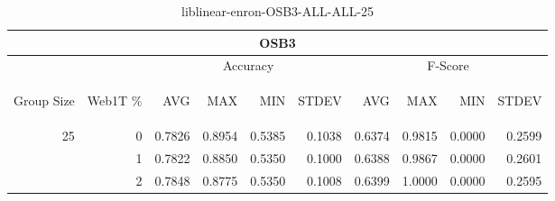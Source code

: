 \begin{center}
\begin{table}[htbp]
\begin{tabular}{ | r | r | r | r | r | r | r | r | r | r |}
\hline
\multicolumn{10}{|c|}{OSB3}\\
\hline
 & & \multicolumn{4}{|c|}{Accuracy} & \multicolumn{4}{|c|}{F-Score}\\ \cline{3-10}
\begin{sideways}Group Size\end{sideways} & \begin{sideways}Web1T \%\end{sideways} & \begin{sideways}AVG\end{sideways} & \begin{sideways}MAX\end{sideways} & \begin{sideways}MIN\end{sideways} & \begin{sideways}STDEV\end{sideways} & \begin{sideways}AVG\end{sideways} & \begin{sideways}MAX\end{sideways} & \begin{sideways}MIN\end{sideways} & \begin{sideways}STDEV\end{sideways}\\
\hline
\multirow{3}{*}{25}
 & 0 & 0.7826 & 0.8954 & 0.5385 & 0.1038 & 0.6374 & 0.9815 & 0.0000 & 0.2599\\ \cline{2-10}
 & 1 & 0.7822 & 0.8850 & 0.5350 & 0.1000 & 0.6388 & 0.9867 & 0.0000 & 0.2601\\ \cline{2-10}
 & 2 & 0.7848 & 0.8775 & 0.5350 & 0.1008 & 0.6399 & 1.0000 & 0.0000 & 0.2595\\ \cline{2-10}
\hline
\end{tabular}
\caption{liblinear-enron-OSB3-ALL-ALL-25}
\end{table}
\end{center}

